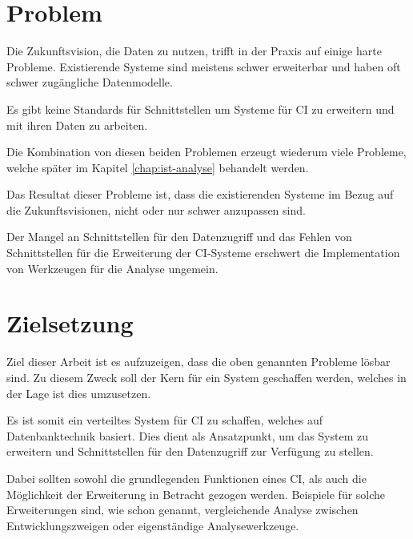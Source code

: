 


\section{Problem}
\label{sec:intro:prob}

Die Zukunftsvision, die Daten zu nutzen,
trifft in der Praxis auf einige harte Probleme.
Existierende Systeme sind meistens schwer erweiterbar und haben oft schwer zugängliche Datenmodelle.

Es gibt keine Standards für Schnittstellen um Systeme für \ac{CI} zu erweitern und mit ihren Daten zu arbeiten.

Die Kombination von diesen beiden Problemen erzeugt wiederum viele Probleme,
welche später im Kapitel \ref{chap:ist-analyse} behandelt werden.

Das Resultat dieser Probleme ist, dass die existierenden Systeme im Bezug auf die Zukunftsvisionen,
nicht oder nur schwer anzupassen sind.

Der Mangel an Schnittstellen für den Datenzugriff und
das Fehlen von Schnittstellen für die Erweiterung der \ac{CI}-Systeme
erschwert die Implementation von Werkzeugen für die Analyse ungemein.


\section{Zielsetzung}
\label{sec:intro:ziel}
Ziel dieser Arbeit ist es aufzuzeigen, dass die oben genannten Probleme lösbar sind.
Zu diesem Zweck soll der Kern für ein System geschaffen werden,
welches in der Lage ist dies umzusetzen.

Es ist somit ein verteiltes System für \ac{CI} zu schaffen,
welches auf Datenbanktechnik basiert.
Dies dient als Ansatzpunkt, um das System zu erweitern und
Schnittstellen für den Datenzugriff zur Verfügung zu stellen.

Dabei sollten sowohl die grundlegenden Funktionen eines \ac{CI},
als auch die Möglichkeit der Erweiterung in Betracht gezogen werden.
Beispiele für solche Erweiterungen sind, wie schon genannt,
vergleichende Analyse zwischen Entwicklungszweigen oder eigenständige Analysewerkzeuge.

